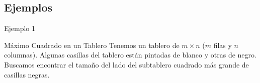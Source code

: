\documentclass[compress]{beamer}
\begin{document}
\subsection{Ejemplos}
\begin{frame}{Ejemplo 1}
	\begin{block}{Máximo Cuadrado en un Tablero}
	Tenemos un tablero de $m \times n$ ($m$ filas y $n$ columnas).
  Algunas casillas del tablero están pintadas de blanco y otras de negro.
  Buscamos encontrar el tamaño del lado del subtablero cuadrado más grande de
  casillas negras.
	\end{block}
	\pause
\end{frame}
\end{document}
